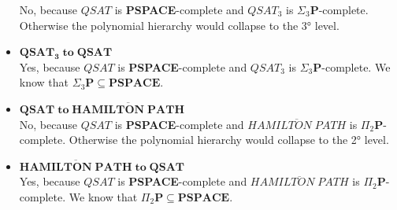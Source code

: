 \begin{itemize}
    No, because $QSAT$ is \textbf{PSPACE}-complete and $QSAT_3$ is $\Sigma_3\mathbf{P}$-complete. Otherwise the polynomial hierarchy would collapse to the 3° level.
    \item $\mathbf{QSAT_3 \; to \;QSAT }$\\
    Yes, because $QSAT$ is \textbf{PSPACE}-complete and $QSAT_3$ is $\Sigma_3\mathbf{P}$-complete. We know that $\Sigma_3\mathbf{P}\subseteq\textbf{PSPACE}$.
    \item $\mathbf{QSAT \; to \; \overline{HAMILTON \; PATH}}$\\
    No, because $QSAT$ is \textbf{PSPACE}-complete and $\overline{HAMILTON \; PATH}$ is $\Pi_2\mathbf{P}$-complete. Otherwise the polynomial hierarchy would collapse to the 2° level.
    \item $\mathbf{\overline{HAMILTON \; PATH} \; to \; QSAT}$\\
    Yes, because $QSAT$ is \textbf{PSPACE}-complete and $\overline{HAMILTON \; PATH}$ is $\Pi_2\mathbf{P}$-complete. We know that $\Pi_2\mathbf{P}\subseteq\textbf{PSPACE}$.
\end{itemize}


